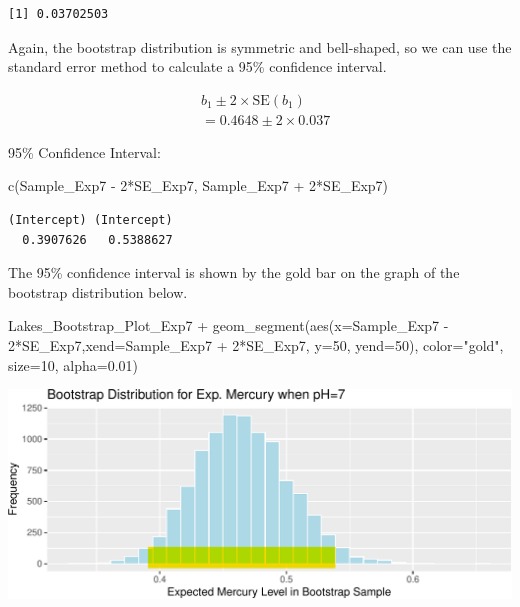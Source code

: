 \documentclass[
  letterpaper,
  DIV=11,
  numbers=noendperiod]{scrreprt}
\newenvironment{Shaded}{\begin{snugshade}}{\end{snugshade}}
\newcommand{\AttributeTok}[1]{\textcolor[rgb]{0.40,0.45,0.13}{#1}}
\newcommand{\DecValTok}[1]{\textcolor[rgb]{0.68,0.00,0.00}{#1}}
\newcommand{\FloatTok}[1]{\textcolor[rgb]{0.68,0.00,0.00}{#1}}
\newcommand{\FunctionTok}[1]{\textcolor[rgb]{0.28,0.35,0.67}{#1}}
\newcommand{\NormalTok}[1]{\textcolor[rgb]{0.00,0.23,0.31}{#1}}
\newcommand{\SpecialCharTok}[1]{\textcolor[rgb]{0.37,0.37,0.37}{#1}}
\newcommand{\StringTok}[1]{\textcolor[rgb]{0.13,0.47,0.30}{#1}}
\begin{document}
\begin{verbatim}
[1] 0.03702503
\end{verbatim}

Again, the bootstrap distribution is symmetric and bell-shaped, so we
can use the standard error method to calculate a 95\% confidence
interval.

\[
\begin{aligned}
& b_1 \pm 2\times\text{SE}(b_1) \\
& = 0.4648 \pm 2\times{0.037}
\end{aligned}
\]

95\% Confidence Interval:

\begin{Shaded}
\begin{Highlighting}[]
\FunctionTok{c}\NormalTok{(Sample\_Exp7 }\SpecialCharTok{{-}} \DecValTok{2}\SpecialCharTok{*}\NormalTok{SE\_Exp7, Sample\_Exp7 }\SpecialCharTok{+} \DecValTok{2}\SpecialCharTok{*}\NormalTok{SE\_Exp7) }
\end{Highlighting}
\end{Shaded}

\begin{verbatim}
(Intercept) (Intercept) 
  0.3907626   0.5388627 
\end{verbatim}

The 95\% confidence interval is shown by the gold bar on the graph of
the bootstrap distribution below.

\begin{Shaded}
\begin{Highlighting}[]
\NormalTok{Lakes\_Bootstrap\_Plot\_Exp7 }\SpecialCharTok{+} 
  \FunctionTok{geom\_segment}\NormalTok{(}\FunctionTok{aes}\NormalTok{(}\AttributeTok{x=}\NormalTok{Sample\_Exp7 }\SpecialCharTok{{-}} \DecValTok{2}\SpecialCharTok{*}\NormalTok{SE\_Exp7,}\AttributeTok{xend=}\NormalTok{Sample\_Exp7 }\SpecialCharTok{+} \DecValTok{2}\SpecialCharTok{*}\NormalTok{SE\_Exp7, }\AttributeTok{y=}\DecValTok{50}\NormalTok{, }\AttributeTok{yend=}\DecValTok{50}\NormalTok{), }
               \AttributeTok{color=}\StringTok{"gold"}\NormalTok{, }\AttributeTok{size=}\DecValTok{10}\NormalTok{, }\AttributeTok{alpha=}\FloatTok{0.01}\NormalTok{) }
\end{Highlighting}
\end{Shaded}

\includegraphics{Ch3_files/figure-pdf/unnamed-chunk-138-1.pdf}
\end{document}
